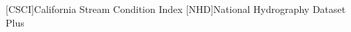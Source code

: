 \usepackage{lineno}
\linenumbers
\usepackage{setspace}
\linespread{2}
\usepackage{cleveref}
\usepackage{acronym}
[CSCI]{California Stream Condition Index}
[NHD]{National Hydrography Dataset Plus}